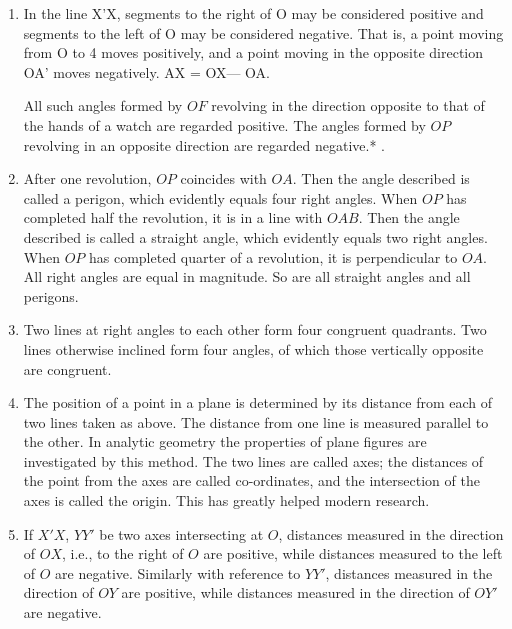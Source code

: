 \begin{enumerate}
\item In the line X’X, segments to the right of O may be considered positive
      and segments to the left of O may be considered negative. That is, a
      point moving from O to 4 moves positively, and a point moving in the
      opposite direction OA’ moves negatively.  AX = OX— OA.


%
%
%
%
%
      All such angles formed by $OF$ revolving in the direction opposite to that 
      of the hands of a watch are regarded positive. The angles formed by $OP$
      revolving in an opposite direction are regarded negative.* .


\item After one revolution, $OP$ coincides with $OA$.  Then the angle described 
    is called a perigon, which evidently equals four right angles.  When $OP$ has
    completed half the revolution, it is in a line with $OAB$.  Then the angle
    described is called a straight angle, which evidently equals two right
    angles.  When $OP$ has completed quarter of a revolution, it is 
    perpendicular to $OA$.  All right angles are equal in magnitude.  So are all
    straight angles and all perigons.


\item Two lines at right angles to each other form four congruent quadrants.
    Two lines otherwise inclined form four angles, of which those vertically
    opposite are congruent.


\item The position of a point in a plane is determined by its distance from each
    of two lines taken as above.  The distance from one line is measured 
    parallel to the other. In analytic geometry the properties of plane figures 
    are investigated by this method.  The two lines are called axes; the 
    distances of the point from the axes are called co-ordinates, and the 
    intersection of the axes is called the origin. This has greatly helped 
    modern research.



\item If $X'X$, $YY'$ be two axes intersecting at $O$, distances measured in the
    direction of $OX$, i.e., to the right of $O$ are positive, while distances
    measured to the left of $O$ are negative. Similarly with reference to $YY'$,
    distances measured in the direction of $OY$ are positive, while distances
    measured in the direction of $OY'$ are negative.



\end{enumerate}
